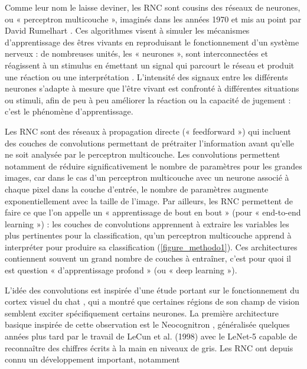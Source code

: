 Comme leur nom le laisse deviner, les RNC sont cousins des réseaux de neurones, ou « perceptron multicouche », imaginés dans les années 1970 et mis au point par David Rumelhart \citep{rumelhart_learning_1986}. Ces algorithmes visent à simuler les mécanismes d’apprentissage des êtres vivants en reproduisant le fonctionnement d’un système nerveux : de nombreuses unités, les « neurones », sont interconnectées et réagissent à un stimulus en émettant un signal qui parcourt le réseau et produit une réaction ou une interprétation \citep{aggarwal_neural_2018}. L’intensité des signaux entre les différents neurones s’adapte à mesure que l’être vivant est confronté à différentes situations ou stimuli, afin de peu à peu améliorer la réaction ou la capacité de jugement : c’est le phénomène d’apprentissage.

Les RNC sont des réseaux à propagation directe (« feedforward ») qui incluent des couches de convolutions permettant de prétraiter l’information avant qu’elle ne soit analysée par le perceptron multicouche. Les convolutions permettent notamment de réduire significativement le nombre de paramètres pour les grandes images, car dans le cas d’un perceptron multicouche avec un neurone associé à chaque pixel dans la couche d’entrée, le nombre de paramètres augmente exponentiellement avec la taille de l’image. Par ailleurs, les RNC permettent de faire ce que l’on appelle un « apprentissage de bout en bout » (pour « end-to-end learning ») : les couches de convolutions apprennent à extraire les variables les plus pertinentes pour la classification, qu’un perceptron multicouche apprend à interpréter pour produire sa classification (\autoref{figure_methodo1}). Ces architectures contiennent souvent un grand nombre de couches à entraîner, c’est pour quoi il est question « d’apprentissage profond » (ou « deep learning »).

L’idée des convolutions est inspirée d’une étude portant sur le fonctionnement du cortex visuel du chat \citep{hubel_receptive_1959}, qui a montré que certaines régions de son champ de vision semblent exciter spécifiquement certains neurones. La première architecture basique inspirée de cette observation est le Neocognitron \citep{fukushima_neocognitron_1988}, généralisée quelques années plus tard par le travail de LeCun et al. (1998) avec le LeNet-5 capable de reconnaître des chiffres écrits à la main en niveaux de gris. Les RNC ont depuis connu un développement important, notamment 


